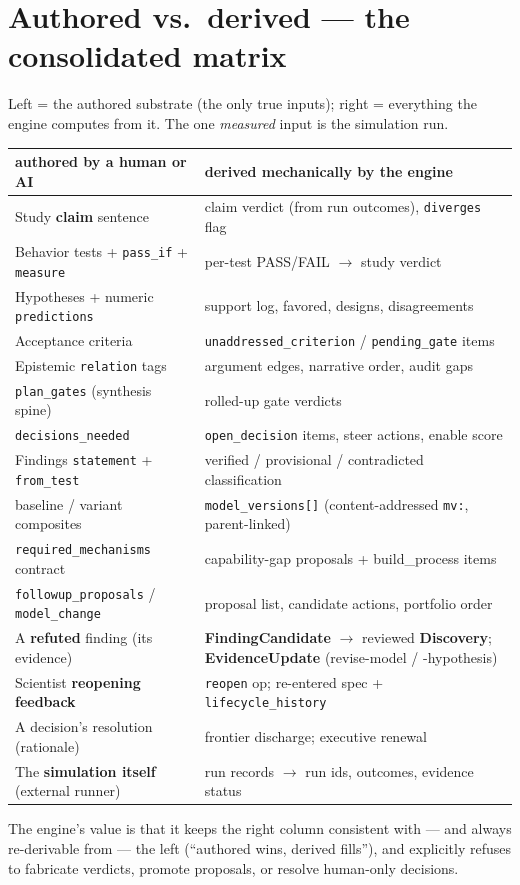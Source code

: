 \documentclass[11pt]{article}
\newcommand{\code}[1]{\texttt{\small #1}}
\begin{document}
\section{Authored vs.\ derived --- the consolidated matrix}

Left = the authored substrate (the only true inputs); right = everything the engine computes from
it. The one \emph{measured} input is the simulation run.

\begin{center}\small
\begin{tabularx}{\textwidth}{@{}>{}Y >{}Y@{}}
\toprule
\textbf{authored by a human or AI} & \textbf{derived mechanically by the engine}\\
\midrule
Study \textbf{claim} sentence & claim verdict (from run outcomes), \code{diverges} flag\\
Behavior tests + \code{pass\_if} + \code{measure} & per-test PASS/FAIL $\rightarrow$ study verdict\\
Hypotheses + numeric \code{predictions} & support log, favored, designs, disagreements\\
Acceptance criteria & \code{unaddressed\_criterion} / \code{pending\_gate} items\\
Epistemic \code{relation} tags & argument edges, narrative order, audit gaps\\
\code{plan\_gates} (synthesis spine) & rolled-up gate verdicts\\
\code{decisions\_needed} & \code{open\_decision} items, steer actions, enable score\\
Findings \code{statement} + \code{from\_test} & verified / provisional / contradicted classification\\
baseline / variant composites & \code{model\_versions[]} (content-addressed \code{mv:}, parent-linked)\\
\code{required\_mechanisms} contract & capability-gap proposals + build\_process items\\
\code{followup\_proposals} / \code{model\_change} & proposal list, candidate actions, portfolio order\\
A \textbf{refuted} finding (its evidence) & \textbf{FindingCandidate} $\rightarrow$ reviewed \textbf{Discovery}; \textbf{EvidenceUpdate} (revise-model / -hypothesis)\\
Scientist \textbf{reopening feedback} & \code{reopen} op; re-entered spec + \code{lifecycle\_history}\\
A decision's resolution (rationale) & frontier discharge; executive renewal\\
The \textbf{simulation itself} (external runner) & run records $\rightarrow$ run ids, outcomes, evidence status\\
\bottomrule
\end{tabularx}
\end{center}
The engine's value is that it keeps the right column consistent with --- and always re-derivable
from --- the left (``authored wins, derived fills''), and explicitly refuses to fabricate verdicts,
promote proposals, or resolve human-only decisions.
\end{document}
